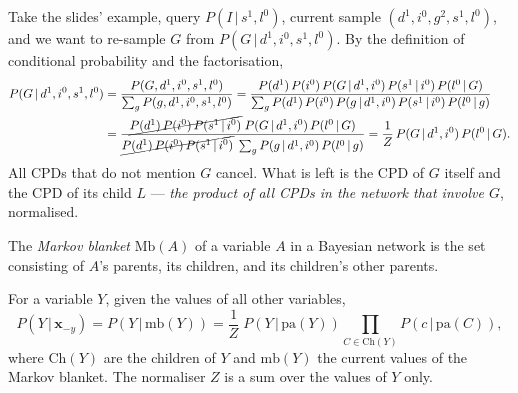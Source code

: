 \documentclass[11pt, oneside]{book}
\newcommand{\Prob}{\mathbb{P}}           %
\newcommand{\given}{\,\vert\,}           %
\newcommand{\pa}{\mathrm{pa}}            %
\newcommand{\Ch}{\mathrm{Ch}}            %
\newcommand{\Mb}{\mathrm{Mb}}            %
\newcommand{\mb}{\mathrm{mb}}            %
\newcommand{\bx}{\mathbf{x}}  \newcommand{\by}{\mathbf{y}}
\begin{document}
Take the slides' example, query $P(I \given s^1, l^0)$, current sample
$(d^1, i^0, g^2, s^1, l^0)$, and we want to re-sample $G$ from $P(G \given d^1,
i^0, s^1, l^0)$. By the definition of conditional probability and the
factorisation,
\begin{align*}
P(G \given d^1, i^0, s^1, l^0)
&= \frac{P(G, d^1, i^0, s^1, l^0)}{\sum_{g} P(g, d^1, i^0, s^1, l^0)}
 = \frac{P(d^1)\, P(i^0)\, P(G \given d^1, i^0)\, P(s^1 \given i^0)\, P(l^0 \given G)}
        {\sum_g P(d^1)\, P(i^0)\, P(g \given d^1, i^0)\, P(s^1 \given i^0)\, P(l^0 \given g)} \\
&= \frac{\cancel{P(d^1)\, P(i^0)\, P(s^1 \given i^0)}\; P(G \given d^1, i^0)\, P(l^0 \given G)}
        {\cancel{P(d^1)\, P(i^0)\, P(s^1 \given i^0)}\; \sum_g P(g \given d^1, i^0)\, P(l^0 \given g)}
 = \frac{1}{Z}\, P(G \given d^1, i^0)\, P(l^0 \given G) .
\end{align*}
All CPDs that do not mention $G$ cancel. What is left is the CPD of $G$
itself and the CPD of its child $L$ --- \emph{the product of all CPDs in the
network that involve $G$}, normalised.

\begin{defbox}[title={Markov blanket}]
The \emph{Markov blanket} $\Mb(A)$ of a variable $A$ in a Bayesian network is
the set consisting of $A$'s parents, its children, and its children's other
parents.
\end{defbox}

\begin{thmbox}[title={Gibbs re-sampling distribution}, unbreakable]
For a variable $Y$, given the values of all other variables,
\[
P(Y \given \bx_{-y}) = P(Y \given \mb(Y))
= \frac{1}{Z}\; P(Y \given \pa(Y)) \prod_{C \in \Ch(Y)} P(c \given \pa(C)),
\]
where $\Ch(Y)$ are the children of $Y$ and $\mb(Y)$ the current values of the
Markov blanket. The normaliser $Z$ is a sum over the values of $Y$ only.
\end{thmbox}
\end{document}
